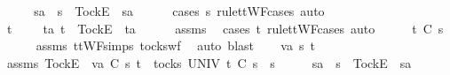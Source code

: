 \begin{isabellebody}
\ \ \isamarkupfalse%
\ \isamarkupfalse%
\ s{}{\isacharprime}a\ \ {\isachardoublequoteopen}s{}{\isacharprime}\ {\isacharequal}\ {\isacharbrackleft}Tock{\isacharbrackright}\isactrlsub E\ {\isacharhash}\ s{}{\isacharprime}a{\isachardoublequoteclose}\isanewline
\ \ \ \ \isamarkupfalse%
\ {\isacharparenleft}cases\ s{}{\isacharprime}\ rule{\isacharcolon}ttWF{\isachardot}cases{\isacharcomma}\ auto{\isacharparenright}\isanewline
\ \ \isamarkupfalse%
\ \isamarkupfalse%
\ {\isachardoublequoteopen}t\ {\isacharequal}\ {\isacharbrackleft}{\isacharbrackright}\ {\isasymor}\ {\isacharparenleft}{\isasymexists}\ ta{\isachardot}\ t\ {\isacharequal}\ {\isacharbrackleft}Tock{\isacharbrackright}\isactrlsub E\ {\isacharhash}\ ta{\isacharparenright}{\isachardoublequoteclose}\isanewline
\ \ \ \ \isamarkupfalse%
\ assms{\isacharparenleft}{}{\isacharparenright}\ \isamarkupfalse%
\ {\isacharparenleft}cases\ t\ rule{\isacharcolon}ttWF{\isachardot}cases{\isacharcomma}\ auto{\isacharparenright}\isanewline
\ \ \isamarkupfalse%
\ \isamarkupfalse%
\ {\isachardoublequoteopen}t\ {\isasymle}\isactrlsub C\ s{}{\isacharprime}{\isachardoublequoteclose}\isanewline
\ \ \ \ \isamarkupfalse%
\ assms{\isacharparenleft}{}{\isacharparenright}\ ttWF{\isachardot}simps{\isacharparenleft}{}{\isacharparenright}\ tocks{\isacharunderscore}wf\ \isamarkupfalse%
\ {\isacharparenleft}auto{\isacharcomma}\ blast{\isacharparenright}\isanewline
{}\isamarkupfalse%
\isanewline
\ \ \isamarkupfalse%
\ va\ s{}{\isacharprime}\ t\isanewline
\ \ \isamarkupfalse%
\ assms{\isacharcolon}\ {\isachardoublequoteopen}{\isacharbrackleft}Tock{\isacharbrackright}\isactrlsub E\ {\isacharhash}\ va\ {\isasymsubseteq}\isactrlsub C\ s{}{\isacharprime}{\isachardoublequoteclose}\ {\isachardoublequoteopen}t\ {\isasymin}\ tocks\ UNIV{\isachardoublequoteclose}\ {\isachardoublequoteopen}t\ {\isasymle}\isactrlsub C\ s{}{\isacharprime}\ {\isacharat}\ s{}{\isachardoublequoteclose}\isanewline
\ \ \isamarkupfalse%
\ \isamarkupfalse%
\ s{}{\isacharprime}a\ \ {\isachardoublequoteopen}s{}{\isacharprime}\ {\isacharequal}\ {\isacharbrackleft}Tock{\isacharbrackright}\isactrlsub E\ {\isacharhash}\ s{}{\isacharprime}a{\isachardoublequoteclose}\isanewline

\end{isabellebody}
